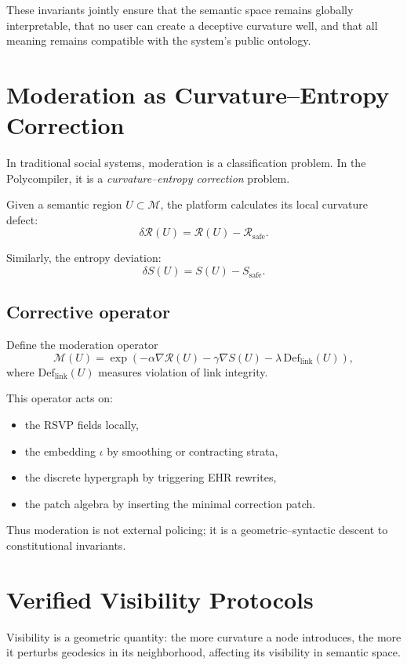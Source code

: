 These invariants jointly ensure that the semantic space remains
globally interpretable, that no user can create a deceptive curvature
well, and that all meaning remains compatible with the system's public
ontology.

\section{Moderation as Curvature--Entropy Correction}

In traditional social systems, moderation is a classification problem.
In the Polycompiler, it is a \emph{curvature--entropy correction} problem.

Given a semantic region $U \subset \mathcal{M}$,
the platform calculates its local curvature defect:
\[
\delta \mathcal{R}(U)
 = \mathcal{R}(U) - \mathcal{R}_{\mathrm{safe}}.
\]

Similarly, the entropy deviation:
\[
\delta S(U) = S(U) - S_{\mathrm{safe}}.
\]

\subsection{Corrective operator}

Define the moderation operator
\[
\mathcal{M}(U)
= \exp\!\left(
  -\alpha \nabla \mathcal{R}(U)
  -\gamma \nabla S(U)
  -\lambda \, \mathrm{Def}_{\mathrm{link}}(U)
\right),
\]
where $\mathrm{Def}_{\mathrm{link}}(U)$ measures violation of link
integrity.

This operator acts on:

\begin{itemize}
  \item the RSVP fields locally,
  \item the embedding $\iota$ by smoothing or contracting strata,
  \item the discrete hypergraph by triggering EHR rewrites,
  \item the patch algebra by inserting the minimal correction patch.
\end{itemize}

Thus moderation is not external policing;  
it is a geometric--syntactic descent to constitutional invariants.

\section{Verified Visibility Protocols}

Visibility is a geometric quantity:
the more curvature a node introduces, the more it perturbs geodesics
in its neighborhood, affecting its visibility in semantic space.

